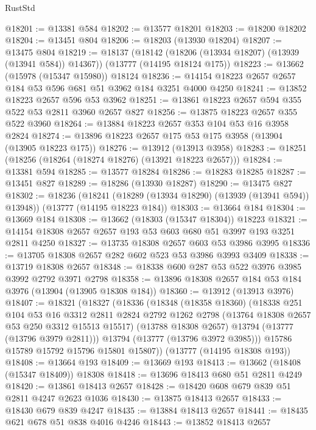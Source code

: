 \begin{lexlean}{RustStd}
\begin{coremodule}
@18201 := @13381 @584
@18202 := @13577 @18201
@18203 := @18200 @18202
@18204 := @13451 @804
@18206 := @18203 (@13930 @18204)
@18207 := @13475 @804
@18219 := @18137
    (@18142 (@18206 (@13934 @18207) (@13939 (@13941 @584)) @14367))
    (@13777 (@14195 @18124 @175))
@18223 := @13662 (@15978 (@15347 @15980)) @18124
@18236 := @14154 @18223 @2657 @2657 @184 @53 @596 @681 @51 @3962 @184 @3251 @4000 @4250
@18241 := @13852 @18223 @2657 @596 @53 @3962
@18251 := @13861 @18223 @2657 @594 @355 @522 @53 @2811 @3960 @2657 @827
@18256 := @13875 @18223 @2657 @355 @522 @3960
@18264 := @13884 @18223 @2657 @353 @104 @53 @16 @3958 @2824
@18274 := @13896 @18223 @2657 @175 @53 @175 @3958 (@13904 (@13905 @18223 @175))
@18276 := @13912 (@13913 @3958)
@18283 := @18251 (@18256 (@18264 (@18274 @18276) (@13921 @18223 @2657)))
@18284 := @13381 @594
@18285 := @13577 @18284
@18286 := @18283 @18285
@18287 := @13451 @827
@18289 := @18286 (@13930 @18287)
@18290 := @13475 @827
@18302 := @18236
    (@18241 (@18289 (@13934 @18290) (@13939 (@13941 @594)) @13948))
    (@13777 (@14195 @18223 @184))
@18303 := @13664 @184
@18304 := @13669 @184
@18308 := @13662 (@18303 (@15347 @18304)) @18223
@18321 := @14154 @18308 @2657 @2657 @193 @53 @603 @680 @51 @3997 @193 @3251 @2811 @4250
@18327 := @13735 @18308 @2657 @603 @53 @3986 @3995
@18336 := @13705 @18308 @2657 @282 @602 @523 @53 @3986 @3993 @3409
@18338 := @13719 @18308 @2657
@18348 := @18338 @600 @287 @53 @522 @3976 @3985 @3992 @2792 @3971 @2798
@18358 := @13896 @18308 @2657 @184 @53 @184 @3976 (@13904 (@13905 @18308 @184))
@18360 := @13912 (@13913 @3976)
@18407 := @18321
    (@18327
      (@18336
        (@18348
          (@18358 @18360)
          (@18338
            @251
            @104
            @53
            @16
            @3312
            @2811
            @2824
            @2792
            @1262
            @2798
            (@13764 @18308 @2657 @53 @250 @3312 @15513 @15517)
            (@13788 @18308 @2657)
            @13794
            (@13777 (@13796 @3979 @2811)))
          @13794
          (@13777 (@13796 @3972 @3985)))
        @15786
        @15789
        @15792
        @15796
        @15801
        @15807))
    (@13777 (@14195 @18308 @193))
@18408 := @13664 @193
@18409 := @13669 @193
@18413 := @13662 (@18408 (@15347 @18409)) @18308
@18418 := @13696 @18413 @680 @51 @2811 @4249
@18420 := @13861 @18413 @2657
@18428 := @18420 @608 @679 @839 @51 @2811 @4247 @2623 @1036
@18430 := @13875 @18413 @2657
@18433 := @18430 @679 @839 @4247
@18435 := @13884 @18413 @2657
@18441 := @18435 @621 @678 @51 @838 @4016 @4246
@18443 := @13852 @18413 @2657

\end{coremodule}
\end{lexlean}
